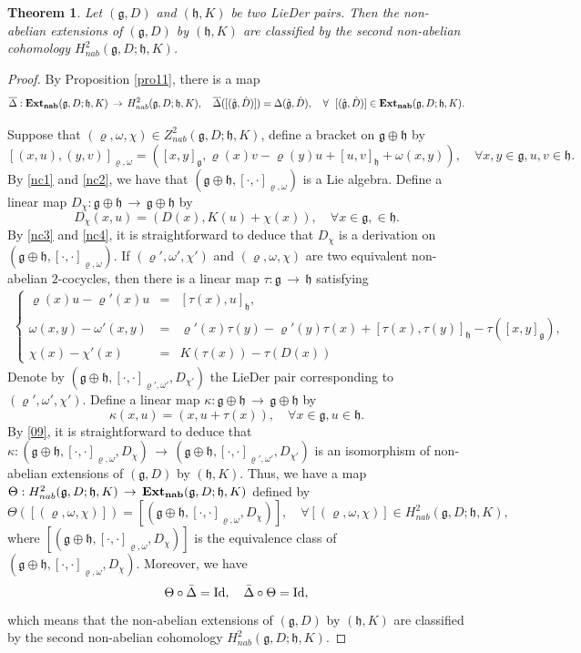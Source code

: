 \documentclass[12pt]{amsart}
\newtheorem{thm}{Theorem}[section]
\newcommand{\lon }{\,\rightarrow\,}
\newcommand{\g}{\mathfrak g}
\newcommand{\h}{\mathfrak h}
\newcommand{\Id}{{\rm{Id}}}
\begin{document}
\begin{thm}\label{corres}
Let $(\g, D)$ and $(\h, K)$ be two {\rm LieDer} pairs. Then the non-abelian extensions of $(\g, D)$ by $(\h, K)$ are classified by the second non-abelian cohomology $H_{nab}^2
(\g, D; \h, K)$.
\end{thm}
\begin{proof}
By Proposition \ref{pro11}, there is a map
$$
\overline{\Delta}: {\rm{\bf Ext_{nab}}}(\g, D; \h, K)\lon H^2_{nab}(\g, D;\h, K),\quad \overline{\Delta}([(\hat{\g}, \hat{D})])=\Delta(\hat{\g}, \hat{D}), \quad \forall~~ [(\hat{\g}, \hat{D})]\in{\rm{\bf Ext_{nab}}}(\g, D; \h, K).
$$

Suppose that $(\varrho, \omega, \chi)\in Z^2_{nab}(\g,D;\h, K)$, define a bracket on $\g\oplus\h$ by
$$
[(x, u), (y, v)]_{\varrho, \omega}=([x, y]_\g, \varrho(x)v-\varrho(y)u+[u, v]_\h+\omega(x, y)), \quad\forall x, y\in\g, u, v\in\h.
$$
By \eqref{nc1} and \eqref{nc2}, we have that $(\g\oplus\h, [\cdot, \cdot]_{\varrho, \omega})$ is a Lie algebra. Define a linear map $D_\chi: \g\oplus\h\lon\g\oplus\h$ by
$$
D_\chi(x, u)=(D(x), K(u)+\chi(x)), \quad \forall x\in\g, \in\h.
$$
By \eqref{nc3} and \eqref{nc4}, it is straightforward to deduce that $D_\chi$ is a derivation on $(\g\oplus\h, [\cdot, \cdot]_{\varrho, \omega})$. If $(\varrho', \omega', \chi')$ and $(\varrho, \omega, \chi)$ are two equivalent non-abelian $2$-cocycles, then there is a linear map $\tau:\g\lon\h$ satisfying
\begin{eqnarray}\label{09}
\left\{\begin{array}{rcl}
\varrho(x)u-\varrho'(x)u&=&[\tau(x), u]_\h,\\
\omega(x, y)-\omega'(x, y)&=&\varrho'(x)\tau(y)-\varrho'(y)\tau(x)+[\tau(x), \tau(y)]_\h-\tau([x, y]_\g),\\
\chi(x)-\chi'(x)&=&K(\tau(x))-\tau(D(x))
\end{array}\right.
\end{eqnarray}
Denote by $(\g\oplus\h, [\cdot, \cdot]_{\varrho', \omega'}, D_{\chi'})$ the {\rm LieDer} pair corresponding to $(\varrho', \omega', \chi')$. Define a linear map $\kappa:\g\oplus\h\lon\g\oplus\h$ by
$$
\kappa(x, u)=(x, u+\tau(x)), \quad\forall x\in\g, u\in\h.
$$
By \eqref{09}, it is straightforward to deduce that $\kappa:(\g\oplus\h, [\cdot, \cdot]_{\varrho, \omega}, D_{\chi})\lon (\g\oplus\h, [\cdot, \cdot]_{\varrho', \omega'}, D_{\chi'})$ is an isomorphism of non-abelian extensions of $(\g, D)$ by $(\h, K)$. Thus, we have a map $\Theta: H_{nab}^2(\g,D; \h, K)\lon {\rm{\bf Ext_{nab}}}(\g, D; \h, K)$ defined by
$$
\Theta([(\varrho, \omega, \chi)])=[(\g\oplus\h, [\cdot, \cdot]_{\varrho, \omega}, D_\chi)], \quad  \forall [(\varrho, \omega, \chi)]\in H_{nab}^2(\g, D; \h, K),
$$
where $[(\g\oplus\h, [\cdot, \cdot]_{\varrho, \omega}, D_\chi)]$ is the equivalence class of $(\g\oplus\h, [\cdot, \cdot]_{\varrho, \omega}, D_\chi)$. Moreover, we have $$\Theta\circ\bar{\Delta}=\Id, \quad \bar{\Delta}\circ\Theta=\Id,$$ which means that the non-abelian extensions of $(\g, D)$ by $(\h, K)$ are classified by the second non-abelian cohomology $H_{nab}^2
(\g, D; \h, K)$.
\end{proof}
\end{document}
